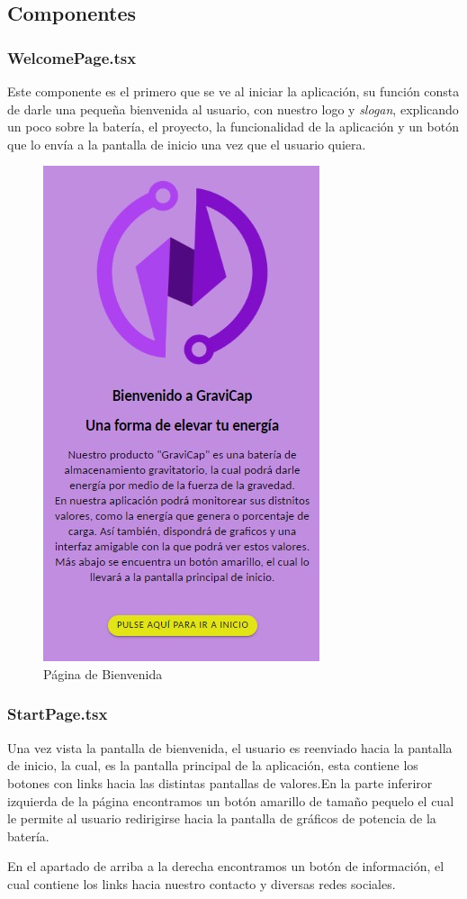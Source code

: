             \subsection{Componentes}
        
                \subsubsection{WelcomePage.tsx}
                
                    Este componente es el primero que se ve al iniciar la aplicación, su función consta de darle una pequeña bienvenida al usuario, con nuestro logo y \textit{slogan}, explicando un poco sobre la batería, el proyecto, la funcionalidad de la aplicación y un botón que lo envía a la pantalla de inicio una vez que el usuario quiera.\par
    
                    \begin{figure} [H]
                        \centering
                        \includegraphics[width=0.25\linewidth]{Imagenes/Aplicación/Welcome.jpg}
                        \caption{Página de Bienvenida}
                        \label{fig:a1}
                    \end{figure}
                
                \subsubsection{StartPage.tsx}
                    Una vez vista la pantalla de bienvenida, el usuario es reenviado hacia la pantalla de inicio, la cual, es la pantalla principal de la aplicación, esta contiene los botones con links hacia las distintas pantallas de valores.En la parte inferiror izquierda de la página encontramos un botón amarillo de tamaño pequelo el cual le permite al usuario redirigirse hacia la pantalla de gráficos de potencia de la batería.\par
                    En el apartado de arriba a la derecha encontramos un botón de información, el cual contiene los links hacia nuestro contacto y diversas redes sociales.\par
                    
